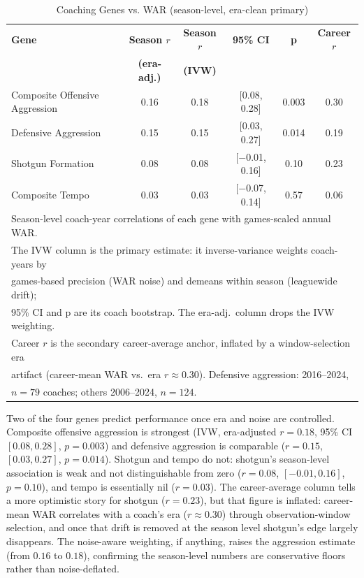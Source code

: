\documentclass[USenglish]{article}
\theoremstyle{dgthm}
\theoremstyle{dgdef}
\begin{document}
\begin{table}[H]
\caption{Coaching Genes vs. WAR (season-level, era-clean primary)}
\label{tab:gene_war}
\begin{tabular}{lccccc}
\toprule
\textbf{Gene} & \textbf{Season $r$} & \textbf{Season $r$} & \textbf{95\% CI} & \textbf{p} & \textbf{Career $r$} \\
 & \textbf{(era-adj.)} & \textbf{(IVW)} & & & \\
\midrule
Composite Offensive Aggression & 0.16 & 0.18 & [0.08, 0.28] & 0.003 & 0.30 \\
Defensive Aggression & 0.15 & 0.15 & [0.03, 0.27] & 0.014 & 0.19 \\
Shotgun Formation & 0.08 & 0.08 & [$-$0.01, 0.16] & 0.10 & 0.23 \\
Composite Tempo & 0.03 & 0.03 & [$-$0.07, 0.14] & 0.57 & 0.06 \\
\midrule
\multicolumn{6}{l}{\small Season-level coach-year correlations of each gene with games-scaled annual WAR.}\\
\multicolumn{6}{l}{\small The IVW column is the primary estimate: it inverse-variance weights coach-years by}\\
\multicolumn{6}{l}{\small games-based precision (WAR noise) and demeans within season (leaguewide drift);}\\
\multicolumn{6}{l}{\small 95\% CI and p are its coach bootstrap. The era-adj.\ column drops the IVW weighting.}\\
\multicolumn{6}{l}{\small Career $r$ is the secondary career-average anchor, inflated by a window-selection era}\\
\multicolumn{6}{l}{\small artifact (career-mean WAR vs.\ era $r\approx0.30$). Defensive aggression: 2016--2024,}\\
\multicolumn{6}{l}{\small $n=79$ coaches; others 2006--2024, $n=124$.}\\
\bottomrule
\end{tabular}
\end{table}

Two of the four genes predict performance once era and noise are controlled. Composite offensive aggression is strongest (IVW, era-adjusted $r=0.18$, 95\% CI $[0.08, 0.28]$, $p=0.003$) and defensive aggression is comparable ($r=0.15$, $[0.03, 0.27]$, $p=0.014$). Shotgun and tempo do not: shotgun's season-level association is weak and not distinguishable from zero ($r=0.08$, $[-0.01, 0.16]$, $p=0.10$), and tempo is essentially nil ($r=0.03$). The career-average column tells a more optimistic story for shotgun ($r=0.23$), but that figure is inflated: career-mean WAR correlates with a coach's era ($r\approx0.30$) through observation-window selection, and once that drift is removed at the season level shotgun's edge largely disappears. The noise-aware weighting, if anything, raises the aggression estimate (from $0.16$ to $0.18$), confirming the season-level numbers are conservative floors rather than noise-deflated.
\end{document}
